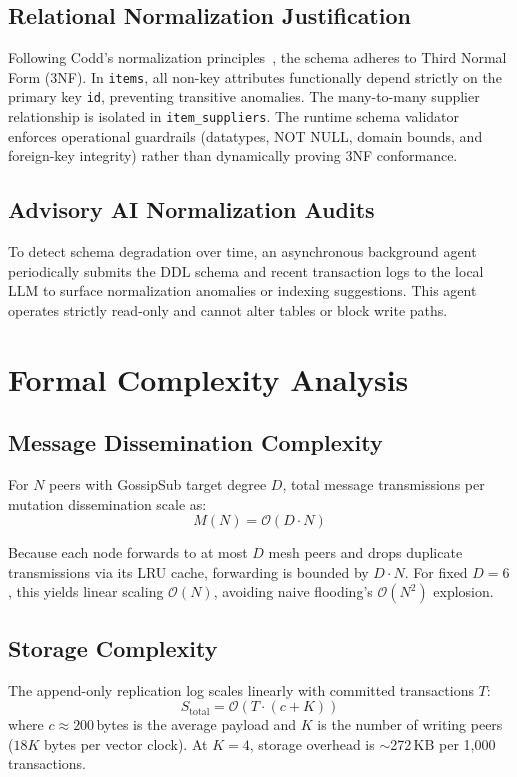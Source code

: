 \subsection{Relational Normalization Justification}
Following Codd's normalization principles~\cite{codd1970relational}, the schema adheres to Third Normal Form (3NF). In \texttt{items}, all non-key attributes functionally depend strictly on the primary key \texttt{id}, preventing transitive anomalies. The many-to-many supplier relationship is isolated in \texttt{item\_suppliers}. The runtime schema validator enforces operational guardrails (datatypes, NOT NULL, domain bounds, and foreign-key integrity) rather than dynamically proving 3NF conformance.

\subsection{Advisory AI Normalization Audits}
To detect schema degradation over time, an asynchronous background agent periodically submits the DDL schema and recent transaction logs to the local LLM to surface normalization anomalies or indexing suggestions. This agent operates strictly read-only and cannot alter tables or block write paths.

\section{Formal Complexity Analysis}
\label{sec:complexity}

\subsection{Message Dissemination Complexity}
\begin{lemma}
For $N$ peers with GossipSub target degree $D$, total message transmissions per mutation dissemination scale as:
\[
M(N) = \mathcal{O}(D \cdot N)
\]
\end{lemma}
Because each node forwards to at most $D$ mesh peers and drops duplicate transmissions via its LRU cache, forwarding is bounded by $D \cdot N$. For fixed $D = 6$, this yields linear scaling $\mathcal{O}(N)$, avoiding naive flooding's $\mathcal{O}(N^2)$ explosion.

\subsection{Storage Complexity}
The append-only replication log scales linearly with committed transactions $T$:
\[
S_{\text{total}} = \mathcal{O}(T \cdot (c + K))
\]
where $c \approx 200$\,bytes is the average payload and $K$ is the number of writing peers ($18K$ bytes per vector clock). At $K=4$, storage overhead is $\sim$272\,KB per 1{,}000 transactions.

